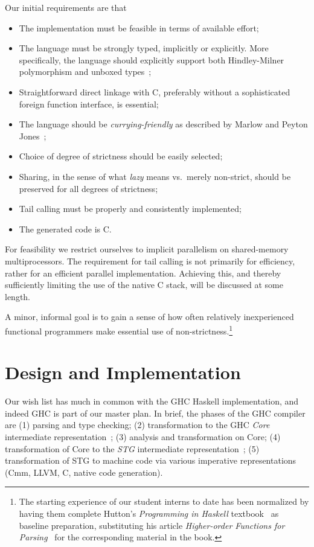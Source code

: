 \documentclass{llncs}
\begin{document}
Our initial requirements are that
%
\begin{itemize}
\item The implementation must be feasible in terms of available effort;
\item The language must be strongly typed, implicitly or explicitly.  More
  specifically, the language should explicitly support both Hindley-Milner
  polymorphism and unboxed types~\cite{Jones:1991};
\item Straightforward direct linkage with C, preferably without a sophisticated
  foreign function interface, is essential;
  \item The language should be \emph{currying-friendly} as described by Marlow
and Peyton Jones~\cite{Marlow:2004};
\item Choice of degree of strictness should be easily selected;
\item Sharing, in the sense of what \emph{lazy} means vs.\ merely non-strict,
  should be preserved for all degrees of strictness;
\item Tail calling must be properly and consistently implemented;
\item The generated code is C.
\end{itemize}
%
For feasibility we restrict ourselves to implicit parallelism on shared-memory
multiprocessors.  The requirement for tail calling is not primarily for
efficiency, rather for an efficient parallel implementation.  Achieving
this, and thereby sufficiently limiting the use of the native C stack, will be
discussed at some length.

A minor, informal goal is to gain a sense of how often relatively
inexperienced functional programmers make essential use of
non-strictness.\footnote{The starting experience of our student interns to
  date has been normalized by having them complete Hutton's \emph{Programming
    in Haskell} textbook~\cite{Hutton-book} as baseline preparation,
  substituting his article \emph{Higher-order Functions for
    Parsing}~\cite{Hutton-parsing:1992} for the corresponding material in the
  book.}

\section{Design and Implementation}
Our wish list has much in common with the GHC Haskell implementation, and
indeed GHC is part of our master plan.  In brief, the phases of the GHC
compiler are (1) parsing and type checking; (2) transformation to the GHC
\emph{Core} intermediate representation~\cite{Sulzmann:2007,ghc-core}; (3)
analysis and transformation on Core; (4) transformation of Core to the
\emph{STG} intermediate representation~\cite{PJ-stockhardware}; (5)
transformation of STG to machine code via various imperative
representations (Cmm, LLVM, C, native code generation).
\end{document}
